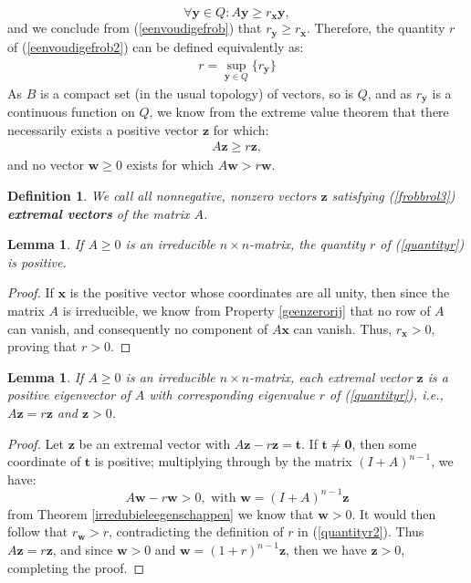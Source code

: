 \documentclass[a4paper,11pt]{report}
\newtheorem{lemma}[theorem]{Lemma}
\newtheorem{definition}[theorem]{Definition}
\begin{document}
$$\forall \mathbf{y} \in Q: A\mathbf{y} \geq r_{\mathbf{x}}\mathbf{y},$$
and we conclude from (\ref{eenvoudigefrob}) that $r_\mathbf{y} \geq 
r_{\mathbf{x}}$. Therefore, the quantity $r$ of (\ref{eenvoudigefrob2}) can be 
defined equivalently as:
\begin{eqnarray}\label{quantityr2}
  r = \sup_{\mathbf{y} \in Q} \{r_{\mathbf{y}}\}
\end{eqnarray}
As $B$ is a compact set (in the usual topology) of vectors, so is $Q$, and as $r_\mathbf{y}$ is a continuous 
function on $Q$, we know from the extreme value theorem that there necessarily exists a positive vector $\mathbf{z}$ for which:
\begin{eqnarray}\label{frobbrol3}
  A\mathbf{z} \geq r\mathbf{z},
 \end{eqnarray}
 and no vector $\mathbf{w} \geq 0$ exists for which $A\mathbf{w} > r\mathbf{w}$. 
\begin{definition}
  We call all nonnegative, nonzero vectors $\mathbf{z}$ satisfying 
  (\ref{frobbrol3})
  \textbf{extremal vectors} of the matrix $A$.
\end{definition}

\begin{lemma}
  If $A \geq 0$ is an irreducible $n\times n$-matrix, the quantity $r$ of (\ref{quantityr}) 
  is positive.
\end{lemma}
\begin{proof}
  If $\mathbf{x}$ is the positive vector whose coordinates are all unity, then since the matrix $A$ is irreducible, 
  we know from Property \ref{geenzerorij} that no row of $A$ can vanish, and consequently no component of $A\mathbf{x}$ 
  can vanish. Thus, $r_\mathbf{x} > 0$, proving that $r > 0$.
  \end{proof}
  
  \begin{lemma}\label{lemmafrobextremal} If $A \geq 0$ is an irreducible $n\times n$-matrix, each extremal vector $\mathbf{z}$ is a positive 
  eigenvector of $A$ with corresponding eigenvalue $r$ of (\ref{quantityr}), i.e., $A\mathbf{z} 
  = r\mathbf{z}$ and $\mathbf{z} > 0$.
  \end{lemma}
  \begin{proof}
    Let $\mathbf{z}$ be an extremal vector with $A\mathbf{z} - r \mathbf{z}= 
    \mathbf{t}$. If $\mathbf{t}\not = \mathbf{0}$, then some coordinate of $\mathbf{t}$ is 
    positive; multiplying through by the matrix $(I+A)^{n-1}$, we have:
    $$A\mathbf{w} - r\mathbf{w} > 0, \text{ with } \mathbf{w} = (I+A)^{n-1}\mathbf{z}$$
    from Theorem \ref{irredubieleegenschappen} we know that $\mathbf{w} > 0$. It 
    would then follow that $r_{\mathbf{w}} > r$, contradicting the definition of 
    $r$ in (\ref{quantityr2}). Thus $A\mathbf{z} = r\mathbf{z}$, and since 
    $\mathbf{w} > 0$ and $\mathbf{w} = (1+r)^{n-1}\mathbf{z}$, then we have $\mathbf{z} 
    > 0$, completing the proof.
  \end{proof}
  
\end{document}
